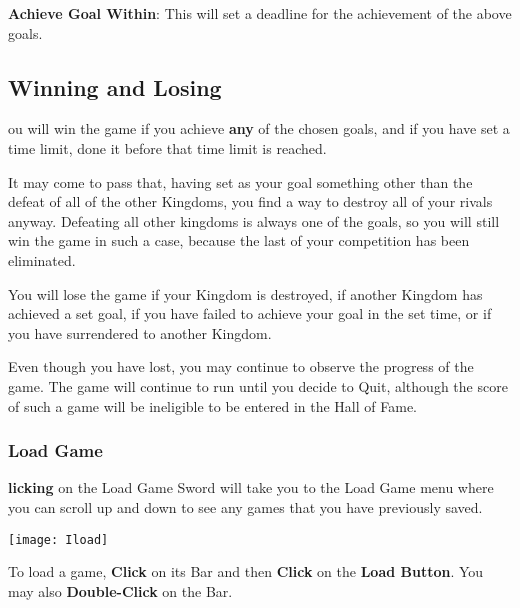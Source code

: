 \textbf{Achieve Goal Within}: This will set a deadline for the achievement of the above goals.

\subsection{Winning and Losing}


ou will win the game if you achieve \textbf{any} of the chosen goals, and if you have set a time limit, done it before that time limit is reached.

It may come to pass that, having set as your goal something other than the defeat of all of the other Kingdoms, you find a way to destroy all of your rivals anyway. Defeating all other kingdoms is always one of the goals, so you will still win the game in such a case, because the last of your competition has been eliminated.

You will lose the game if your Kingdom is destroyed, if another Kingdom has achieved a set goal, if you have failed to achieve your goal in the set time, or if you have surrendered to another Kingdom.


Even though you have lost, you may continue to observe the progress of the game. The game will continue to run until you decide to Quit, although the score of such a game will be ineligible to be entered in the Hall of Fame.

\subsubsection{Load Game}


\textbf{licking} on the Load Game Sword will take you to the Load Game menu where you can scroll up and down to see any games that you have previously saved.

\begin{center}
    \texttt{[image: Iload]} %
\end{center}


To load a game, \textbf{Click} on its Bar and then \textbf{Click} on the \textbf{Load Button}. You may also \textbf{Double-Click} on the Bar.

